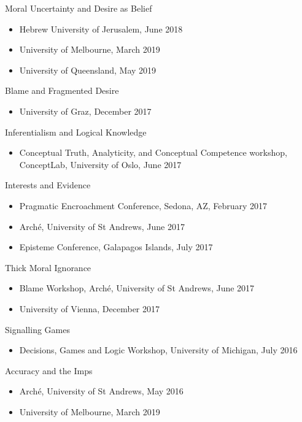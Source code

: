 \documentclass[
  10pt,
  letterpaper,
  DIV=11,
  numbers=noendperiod,
  twoside]{scrartcl}
\providecommand{\tightlist}{%
  \setlength{\itemsep}{0pt}\setlength{\parskip}{0pt}}\usepackage{longtable,booktabs,array}
\begin{document}
Moral Uncertainty and Desire as Belief

\begin{itemize}
\tightlist
\item
  Hebrew University of Jerusalem, June 2018
\item
  University of Melbourne, March 2019
\item
  University of Queensland, May 2019
\end{itemize}

Blame and Fragmented Desire

\begin{itemize}
\tightlist
\item
  University of Graz, December 2017
\end{itemize}

Inferentialism and Logical Knowledge

\begin{itemize}
\tightlist
\item
  Conceptual Truth, Analyticity, and Conceptual Competence workshop,
  ConceptLab, University of Oslo, June 2017
\end{itemize}

Interests and Evidence

\begin{itemize}
\tightlist
\item
  Pragmatic Encroachment Conference, Sedona, AZ, February 2017
\item
  Arché, University of St Andrews, June 2017
\item
  Episteme Conference, Galapagos Islands, July 2017
\end{itemize}

Thick Moral Ignorance

\begin{itemize}
\tightlist
\item
  Blame Workshop, Arché, University of St Andrews, June 2017
\item
  University of Vienna, December 2017
\end{itemize}

Signalling Games

\begin{itemize}
\tightlist
\item
  Decisions, Games and Logic Workshop, University of Michigan, July 2016
\end{itemize}

Accuracy and the Imps

\begin{itemize}
\tightlist
\item
  Arché, University of St Andrews, May 2016
\item
  University of Melbourne, March 2019
\end{itemize}
\end{document}
